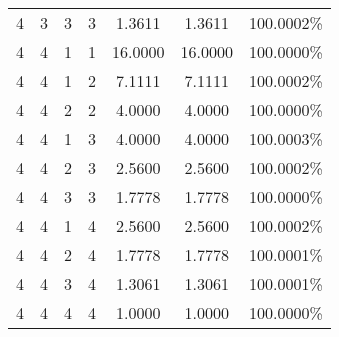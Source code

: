 \documentclass[11pt,a4paper]{article}
\numberwithin{equation}{section}
\begin{document}
\begin{appendices}
\begin{center}
\begin{tabular}{cccc|cc|c}
			4 & 3 & 3 & 3 & 1.3611 & 1.3611 & 100.0002\% \\
			4 & 4 & 1 & 1 & 16.0000 & 16.0000 & 100.0000\% \\
			4 & 4 & 1 & 2 & 7.1111 & 7.1111 & 100.0002\% \\
			4 & 4 & 2 & 2 & 4.0000 & 4.0000 & 100.0000\% \\
			4 & 4 & 1 & 3 & 4.0000 & 4.0000 & 100.0003\% \\
			4 & 4 & 2 & 3 & 2.5600 & 2.5600 & 100.0002\% \\
			4 & 4 & 3 & 3 & 1.7778 & 1.7778 & 100.0000\% \\
			4 & 4 & 1 & 4 & 2.5600 & 2.5600 & 100.0002\% \\
			4 & 4 & 2 & 4 & 1.7778 & 1.7778 & 100.0001\% \\
			4 & 4 & 3 & 4 & 1.3061 & 1.3061 & 100.0001\% \\
			4 & 4 & 4 & 4 & 1.0000 & 1.0000 & 100.0000\% \\
			\hline
		\end{tabular}
	\end{center}
	
	\end{appendices}
		
	
	
	
	
\end{document}
